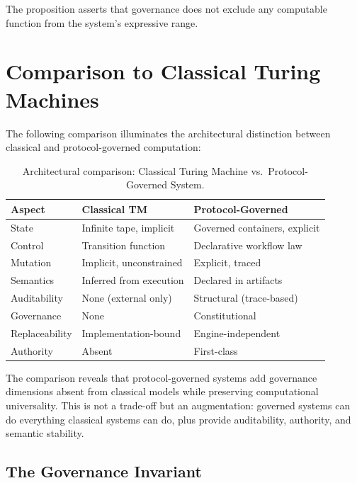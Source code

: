 \documentclass[11pt,a4paper]{article}
\begin{document}
The proposition asserts that governance does not exclude any computable function from the system's expressive range.



\section{Comparison to Classical Turing Machines}
\label{sec:comparison}

The following comparison illuminates the architectural distinction between classical and protocol-governed computation:

\begin{table}[h]
\centering
\caption{Architectural comparison: Classical Turing Machine vs.\ Protocol-Governed System.}
\label{tab:comparison}
\begin{tabular}{@{}lll@{}}
\toprule
\textbf{Aspect} & \textbf{Classical TM} & \textbf{Protocol-Governed} \\
\midrule
State & Infinite tape, implicit & Governed containers, explicit \\
Control & Transition function & Declarative workflow law \\
Mutation & Implicit, unconstrained & Explicit, traced \\
Semantics & Inferred from execution & Declared in artifacts \\
Auditability & None (external only) & Structural (trace-based) \\
Governance & None & Constitutional \\
Replaceability & Implementation-bound & Engine-independent \\
Authority & Absent & First-class \\
\bottomrule
\end{tabular}
\end{table}

The comparison reveals that protocol-governed systems add governance dimensions absent from classical models while preserving computational universality. This is not a trade-off but an augmentation: governed systems can do everything classical systems can do, plus provide auditability, authority, and semantic stability.

\subsection{The Governance Invariant}
\end{document}
